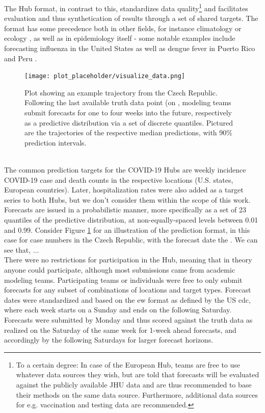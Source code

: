 The Hub format, in contrast to this, standardizes data quality\footnote{To a certain degree: In case of the European Hub, teams are free to use whatever data sources they wish, but are told that forecasts will be evaluated against the publicly available JHU data and are thus recommended to base their methods on the same data source. Furthermore, additional data sources for e.g. vaccination and testing data are recommended.} and facilitates evaluation and thus synthetication of results through a set of shared targets. The format has some precedence both in other fields, for instance climatology or ecology \citep{warszawski_inter-sectoral_2014}, as well as in epidemiology itself - some notable examples include forecasting influenza in the United States \citep{reich_collaborative_2019} as well as dengue fever in Puerto Rico and Peru \citep{johansson_open_2019}. 
\begin{figure}
\texttt{[image: plot\_placeholder/visualize\_data.png]}
\caption{ Plot showing an example trajectory from the Czech Republic. Following the last available truth data point (on , modeling teams submit forecasts for one to four weeks into the future, respectively as a predictive distribution via a set of discrete quantiles. Pictured are the trajectories of the respective median predictions, with 90\% prediction intervals.}
\label{fig:czech_predictions}
\end{figure} \\
The common prediction targets for the COVID-19 Hubs are weekly incidence COVID-19 case and death counts in the respective locations (U.S. states, European countries). Later, hospitalization rates were also added as a target series to both Hubs, but we don't consider them within the scope of this work.\\ Forecasts are issued in a probabilistic manner, more specifically as a set of 23 quantiles of the predictive distribution, at non-equally-spaced levels between 0.01 and 0.99. Consider Figure \ref{fig:czech_predictions} for an illustration of the prediction format, in this case for case numbers in the Czech Republic, with the forecast date the . We can see that, ...\\ 
There were no restrictions for participation in the Hub, meaning that in theory anyone could participate, although most submissions came from academic modeling teams. Participating teams or individuals were free to only submit forecasts for any subset of combinations of locations and target types. Forecast dates were standardized and based on the \ac{ew} format as defined by the US \ac{cdc}, where each week starts on a Sunday and ends on the following Saturday. Forecasts were submitted by Monday and thus scored against the truth data as realized on the Saturday of the same week for 1-week ahead forecasts, and accordingly by the following Saturdays for larger forecast horizons.\\ 

